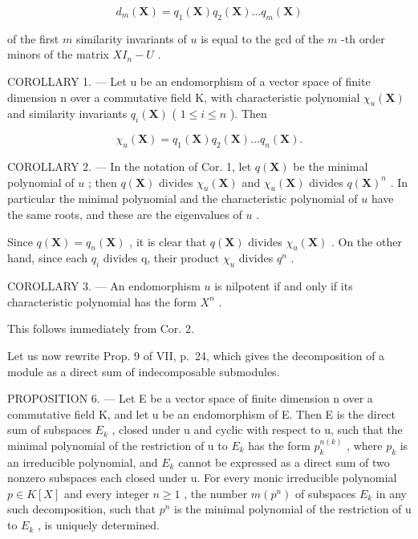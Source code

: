 \[
d _ {m} (\mathbf {X}) = q _ {1} (\mathbf {X}) q _ {2} (\mathbf {X}) \dots q _ {m} (\mathbf {X})
\]

of the first \(m\) similarity invariants of \(u\) is equal to the gcd of the \(m\) -th order minors of the matrix \(XI_{n} - U\) .

COROLLARY 1. --- Let u be an endomorphism of a vector space of finite dimension n over a commutative field K, with characteristic polynomial \(\chi_{u}(\mathbf{X})\) and similarity invariants \(q_{i}(\mathbf{X})\) ( \(1 \leqslant i \leqslant n\) ). Then

\[
\chi_ {u} (\mathbf {X}) = q _ {1} (\mathbf {X}) q _ {2} (\mathbf {X}) \dots q _ {n} (\mathbf {X}).
\]

COROLLARY 2. --- In the notation of Cor. 1, let \(q(\mathbf{X})\) be the minimal polynomial of \(u\) ; then \(q(\mathbf{X})\) divides \(\chi_u(\mathbf{X})\) and \(\chi_u(\mathbf{X})\) divides \(q(\mathbf{X})^n\) . In particular the minimal polynomial and the characteristic polynomial of \(u\) have the same roots, and these are the eigenvalues of \(u\) .

Since \(q(\mathbf{X}) = q_{n}(\mathbf{X})\) , it is clear that \(q(\mathbf{X})\) divides \(\chi_{u}(\mathbf{X})\) . On the other hand, since each \(q_{i}\) divides q, their product \(\chi_{u}\) divides \(q^{n}\) .

COROLLARY 3. --- An endomorphism \(u\) is nilpotent if and only if its characteristic polynomial has the form \(X^n\) .

This follows immediately from Cor. 2.

Let us now rewrite Prop. 9 of VII, p.~24, which gives the decomposition of a module as a direct sum of indecomposable submodules.

PROPOSITION 6. --- Let E be a vector space of finite dimension n over a commutative field K, and let u be an endomorphism of E. Then E is the direct sum of subspaces \(E_{k}\) , closed under u and cyclic with respect to u, such that the minimal polynomial of the restriction of u to \(E_{k}\) has the form \(p_{k}^{n(k)}\) , where \(p_{k}\) is an irreducible polynomial, and \(E_{k}\) cannot be expressed as a direct sum of two nonzero subspaces each closed under u. For every monic irreducible polynomial \(p \in K[X]\) and every integer \(n \geqslant 1\) , the number \(m(p^{n})\) of subspaces \(E_{k}\) in any such decomposition, such that \(p^{n}\) is the minimal polynomial of the restriction of u to \(E_{k}\) , is uniquely determined.


